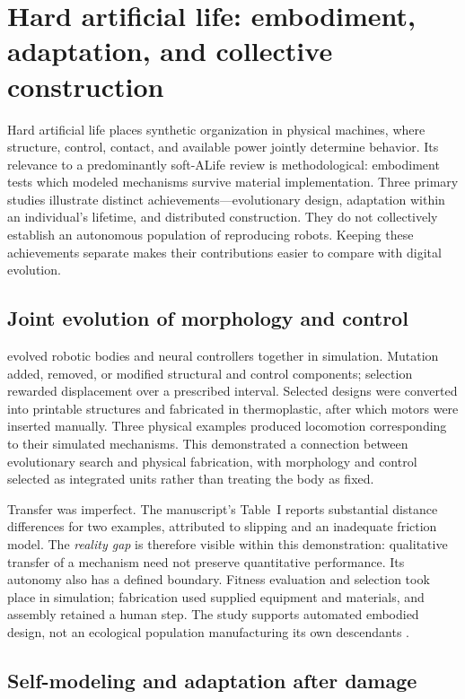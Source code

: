 \section{Hard artificial life: embodiment, adaptation, and collective construction}
\label{sec:hard-life}

Hard artificial life places synthetic organization in physical machines, where
structure, control, contact, and available power jointly determine behavior.
Its relevance to a predominantly soft-ALife review is methodological: embodiment
tests which modeled mechanisms survive material implementation. Three primary
studies illustrate distinct achievements---evolutionary design, adaptation within
an individual's lifetime, and distributed construction. They do not collectively
establish an autonomous population of reproducing robots. Keeping these
achievements separate makes their contributions easier to compare with digital
evolution.

\subsection{Joint evolution of morphology and control}

\citet{hardlipson2000} evolved robotic bodies and neural controllers together in
simulation. Mutation added, removed, or modified structural and control
components; selection rewarded displacement over a prescribed interval. Selected
designs were converted into printable structures and fabricated in thermoplastic,
after which motors were inserted manually. Three physical examples produced
locomotion corresponding to their simulated mechanisms. This demonstrated a
connection between evolutionary search and physical fabrication, with morphology
and control selected as integrated units rather than treating the body as fixed.

Transfer was imperfect. The manuscript's Table~I reports substantial distance
differences for two examples, attributed to slipping and an inadequate friction
model. The \emph{reality gap} is therefore visible within this demonstration:
qualitative transfer of a mechanism need not preserve quantitative performance.
Its autonomy also has a defined boundary. Fitness evaluation and selection took
place in simulation; fabrication used supplied equipment and materials, and
assembly retained a human step. The study supports automated embodied design,
not an ecological population manufacturing its own descendants
\citep{hardlipson2000}.

\subsection{Self-modeling and adaptation after damage}


